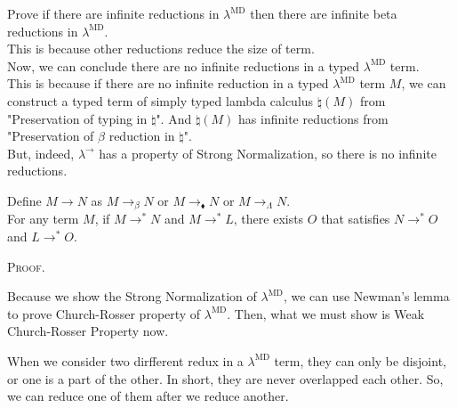 Prove if there are infinite reductions in $\lambda^{\text{MD}}$ then there are infinite beta reductions in $\lambda^{\text{MD}}$.\\
This is because other reductions reduce the size of term.\\
	
Now, we can conclude there are no infinite reductions in a typed $\lambda^{\text{MD}}$ term. \\
	
This is because if there are no infinite reduction in a typed $\lambda^{\text{MD}}$ term $M$,
we can construct a typed term of simply typed lambda calculus $\natural(M)$ from "Preservation of typing in $\natural$".
And $\natural(M)$ has infinite reductions from "Preservation of $\beta$ reduction in $\natural$".\\
	
But, indeed, $\lambda^\to$ has a property of Strong Normalization, so there is no infinite reductions.
	
\begin{theorem}
	Define $M \longrightarrow N$ as $M \longrightarrow_{\beta} N$ or $M\longrightarrow_\blacklozenge N$ or  $M \longrightarrow_{\Lambda} N$.\\
	For any term $M$, if $M \longrightarrow^* N$ and $M \longrightarrow^* L$,
	there exists $O$ that satisfies $N \longrightarrow^* O$ and $L \longrightarrow^* O$.
\end{theorem}
	
\textsc{Proof.}
	
Because we show the Strong Normalization of $\lambda^{\text{MD}}$, we can use Newman's lemma to prove Church-Rosser property of $\lambda^{\text{MD}}$.
Then, what we must show is Weak Church-Rosser Property now.
	
When we consider two dirfferent redux in a $\lambda^{\text{MD}}$ term, they can only be disjoint, or one is a part of the other.
In short, they are never overlapped each other.
So, we can reduce one of them after we reduce another.\\
	
